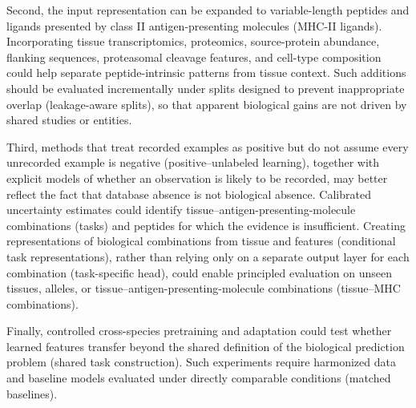 Second, the input representation can be expanded to variable-length peptides and ligands presented by class II antigen-presenting molecules (MHC-II ligands). Incorporating tissue transcriptomics, proteomics, source-protein abundance, flanking sequences, proteasomal cleavage features, and cell-type composition could help separate peptide-intrinsic patterns from tissue context. Such additions should be evaluated incrementally under splits designed to prevent inappropriate overlap (leakage-aware splits), so that apparent biological gains are not driven by shared studies or entities.

Third, methods that treat recorded examples as positive but do not assume every unrecorded example is negative (positive--unlabeled learning), together with explicit models of whether an observation is likely to be recorded, may better reflect the fact that database absence is not biological absence. Calibrated uncertainty estimates could identify tissue--antigen-presenting-molecule combinations (tasks) and peptides for which the evidence is insufficient. Creating representations of biological combinations from tissue and \plainMHC{} features (conditional task representations), rather than relying only on a separate output layer for each combination (task-specific head), could enable principled evaluation on unseen tissues, alleles, or tissue--antigen-presenting-molecule combinations (tissue--MHC combinations).

Finally, controlled cross-species pretraining and adaptation could test whether learned features transfer beyond the shared definition of the biological prediction problem (shared task construction). Such experiments require harmonized data and baseline models evaluated under directly comparable conditions (matched baselines).
